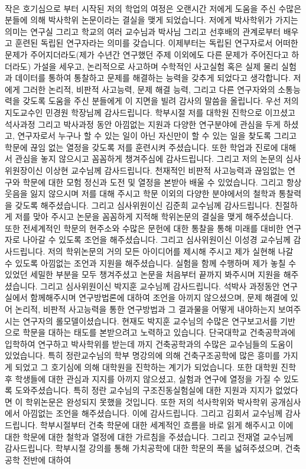 \begin{center}
\\
\end{center}
작은 호기심으로 부터 시작된 저의 학업의 여정은 오랜시간 저에게 도움을 주신 수많은 분들에 의해 박사학위 논문이라는 결실을 맺게 되었습니다. 저에게 박사학위가 가지는 의미는 연구실 그리고 학교의 여러 교수님과 박사님 그리고 선후배의 관계로부터 배우고 훈련된 독립된 연구자라는 의미를 갖습니다. 이제부터는 독립된 연구자로서 어떠한 문제가 주어지더라도(제가 수년간 연구했던 주제 이외에도 다른 문제가 주어진다고 하더라도) 가설을 세우고, 논리적으로 사고하며 수학적인 사고실험 혹은 실제 물리 실험과 데이터를 통하여 통찰하고 문제를 해결하는 능력을 갖추게 되었다고 생각합니다. 저에게 그러한 논리적, 비판적 사고능력, 문제 해결 능력, 그리고 다른 연구자와의 소통능력을 갖도록 도움을 주신 분들에게 이 지면을 빌려 감사의 말씀을 올립니다.
우선 저의 지도교수인 민경원 학장님께 감사드립니다. 학부시절 저를 대학원 진학으로 이끄셨고 석사과정 그리고 박사과정 동안 아낌없는 지원과 다양한 연구분야에 관심을 두게 하셨고, 연구자로서 누구나 할 수 있는 일이 아닌 자신만이 할 수 있는 일을 찾도록 그리고 학문에 끊임 없는 열정을 갖도록 저를 훈련시켜 주셨습니다. 또한 학업과 진로에 대해서 관심을 놓지 않으시고 꼼꼼하게 챙겨주심에 감사드립니다. 그리고 저의 논문의 심사위원장이신 이상현 교수님께 감사드립니다. 천재적인 비판적 사고능력과 끊임없는 연구와 학문에 대한 모험 정신과 도전 및 열정을 본받아 배울 수 있었습니다. 그리고 항상 웃음을 잃지 않으시며 저를 대해 주시고 학문 이외의 다양한 분야에서의 철학과 통찰력을 갖도록 해주셨습니다. 그리고 심사위원이신 김준희 교수님께 감사드립니다. 친절하게 저를 맞아 주시고 논문을 꼼꼼하게 지적해 학위논문의 결실을 맺게 해주셨습니다. 또한 전세계적인 학문의 현주소와 수많은 문헌에 대한 통찰을 통해 미래를 대비한 연구자로 나아갈 수 있도록 조언을 해주셨습니다. 그리고 심사위원이신 이성경 교수님께 감사드립니다. 저의 학위논문의 거의 모든 아이디어를 제시해 주시고 제가 실현해 나갈 수 있도록 아낌없는 조언과 지원을 해주셨습니다. 실험을 함께 수행하며 제가 놓칠 수 있었던 세밀한 부분을 모두 챙겨주셨고 논문을 처음부터 끝까지 봐주시며 지원을 해주셨습니다. 그리고 심사위원이신 박지훈 교수님께 감사드립니다. 석박사 과정동안 연구실에서 함께해주시며 연구방법론에 대하여 조언을 아끼지 않으셨으며, 문제 해결에 있어 논리적, 비판적 사고능력을 통한 연구방법과 그 결과물을 어떻게 내야하는지 보여주시는 연구자의 롤모델이셨습니다. 현재도 박지훈 교수님의 수많은 연구보고서를 기반으로 학문을 대하는 태도를 본받으려고 노력하고 있습니다.
단국대학교 건축공학과에 입학하여 연구하고 박사학위를 받는데 까지 건축공학과의 수많은 교수님들의 도움이 있었습니다. 특히 정란교수님의 학부 명강의에 의해 건축구조공학에 많은 흥미를 가지게 되었고 그 호기심에 의해 대학원을 진학하는 계기가 되었습니다. 또한 대학원 진학후 학생들에 대한 관심과 지지를 아끼지 않으셨고, 실험과 연구에 열정을 가질 수 있도록 도와주셨습니다. 특히 정란 교수님의 구조진동실험실에 대한 지원과 지지가 없었다면 이 학위논문은 완성되지 못했을 것입니다. 또한 저의 석사학위와 박사학위 공개심사에서 아낌없는 조언을 해주셨습니다. 이에 감사드립니다. 그리고 김회서 교수님께 감사드립니다. 학부시절부터 건축 학문에 대한 세계적인 흐름을 바로 읽게 해주시고 이에 대한 학문에 대한 철학과 열정에 대한 가르침을 주셨습니다. 그리고 전재열 교수님께 감사드립니다. 학부시절 강의를 통해 가치공학에 대한 학문의 폭을 넓혀주셨으며, 건축공학 전반에 대하여 
